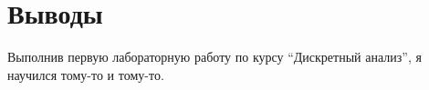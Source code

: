 \section{Выводы}
Выполнив первую лабораторную работу по курсу \enquote{Дискретный анализ}, я научился тому-то и тому-то.
\pagebreak
